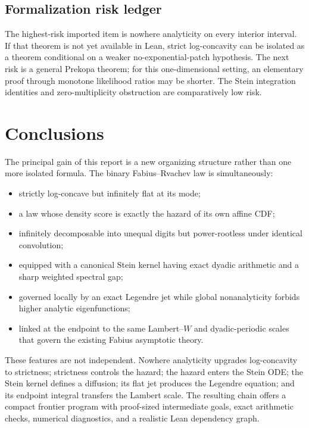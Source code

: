 \documentclass[11pt,oneside]{article}
\theoremstyle{definition}
\theoremstyle{remark}
\begin{document}
\subsection{Formalization risk ledger}
The highest-risk imported item is nowhere analyticity on every interior interval.
If that theorem is not yet available in Lean, strict log-concavity can be isolated
as a theorem conditional on a weaker no-exponential-patch hypothesis.  The next
risk is a general Prekopa theorem; for this one-dimensional setting, an elementary
proof through monotone likelihood ratios may be shorter.  The Stein integration
identities and zero-multiplicity obstruction are comparatively low risk.

\section{Conclusions}
The principal gain of this report is a new organizing structure rather than one
more isolated formula.  The binary Fabius--Rvachev law is simultaneously:

\begin{itemize}
\item strictly log-concave but infinitely flat at its mode;
\item a law whose density score is exactly the hazard of its own affine CDF;
\item infinitely decomposable into unequal digits but power-rootless under
identical convolution;
\item equipped with a canonical Stein kernel having exact dyadic arithmetic and a
sharp weighted spectral gap;
\item governed locally by an exact Legendre jet while global nonanalyticity forbids
higher analytic eigenfunctions;
\item linked at the endpoint to the same Lambert--$W$ and dyadic-periodic scales
that govern the existing Fabius asymptotic theory.
\end{itemize}

These features are not independent.  Nowhere analyticity upgrades log-concavity to
strictness; strictness controls the hazard; the hazard enters the Stein ODE; the
Stein kernel defines a diffusion; its flat jet produces the Legendre equation; and
its endpoint integral transfers the Lambert scale.  The resulting chain offers a
compact frontier program with proof-sized intermediate goals, exact arithmetic
checks, numerical diagnostics, and a realistic Lean dependency graph.
\end{document}
